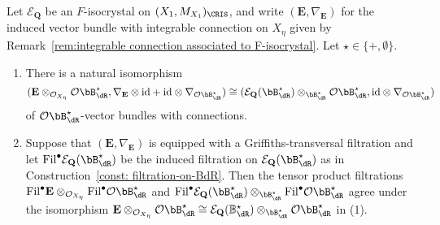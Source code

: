 \begin{prop} \label{prop:connection-filtration-compatibility}
Let $\mathcal{E}_{\mathbf{Q}}$ be an $F$-isocrystal on $(X_1,M_{X_1})_{\CRIS}$, and write $(\mathbf{E}, \nabla_{\mathbf{E}})$ for the induced vector bundle with integrable connection on $X_{\eta}$ given by Remark~\ref{rem:integrable connection associated to F-isocrystal}. 
Let $\star\in \{+,\emptyset\}$.
\begin{enumerate}
    \item There is a natural isomorphism 
\[
(\mathbf{E}\otimes_{\mathcal{O}_{X_{\eta}}} \mathcal{O}\bB^{\star}_{\dR}, \nabla_{\mathbf{E}}\otimes\mathrm{id}+\mathrm{id}\otimes\nabla_{\mathcal{O}\bB^{\star}_{\dR}}) \cong (\mathcal{E}_{\mathbf{Q}}(\bB^{\star}_{\dR})\otimes_{\bB^{\star}_{\dR}} \mathcal{O}\bB^{\star}_{\dR}, \mathrm{id}\otimes \nabla_{\mathcal{O}\bB^{\star}_{\dR}})
\]
of $\mathcal{O}\bB^{\star}_{\dR}$-vector bundles with connections.
    \item Suppose that $(\mathbf{E},\nabla_{\mathbf{E}})$ is equipped with a Griffiths-transversal filtration and let $\mathrm{Fil}^{\bullet}\mathcal{E}_{\mathbf{Q}}(\bB^{\star}_{\dR})$ be the induced filtration on $\mathcal{E}_{\mathbf{Q}}(\bB^{\star}_{\dR})$ as in Construction~\ref{const: filtration-on-BdR}. Then the tensor product filtrations $\mathrm{Fil}^{\bullet} \mathbf{E}\otimes_{\mathcal{O}_{X_{\eta}}} \mathrm{Fil}^{\bullet}\mathcal{O}\bB^{\star}_{\dR}$ and $\mathrm{Fil}^{\bullet}\mathcal{E}_{\mathbf{Q}}(\bB^{\star}_{\dR})\otimes_{\bB^{\star}_{\dR}} \mathrm{Fil}^{\bullet}\mathcal{O}\bB^{\star}_{\dR}$ agree under the isomorphism $\mathbf{E}\otimes_{\mathcal{O}_{X_{\eta}}} \mathcal{O}\bB^{\star}_{\dR}\cong \mathcal{E}_{\mathbf{Q}}(\mathbb{B}^{\star}_{\dR})\otimes_{\bB^{\star}_{\dR}} \mathcal{O}\bB^{\star}_{\dR}$ in (1).
\end{enumerate}
\end{prop}



